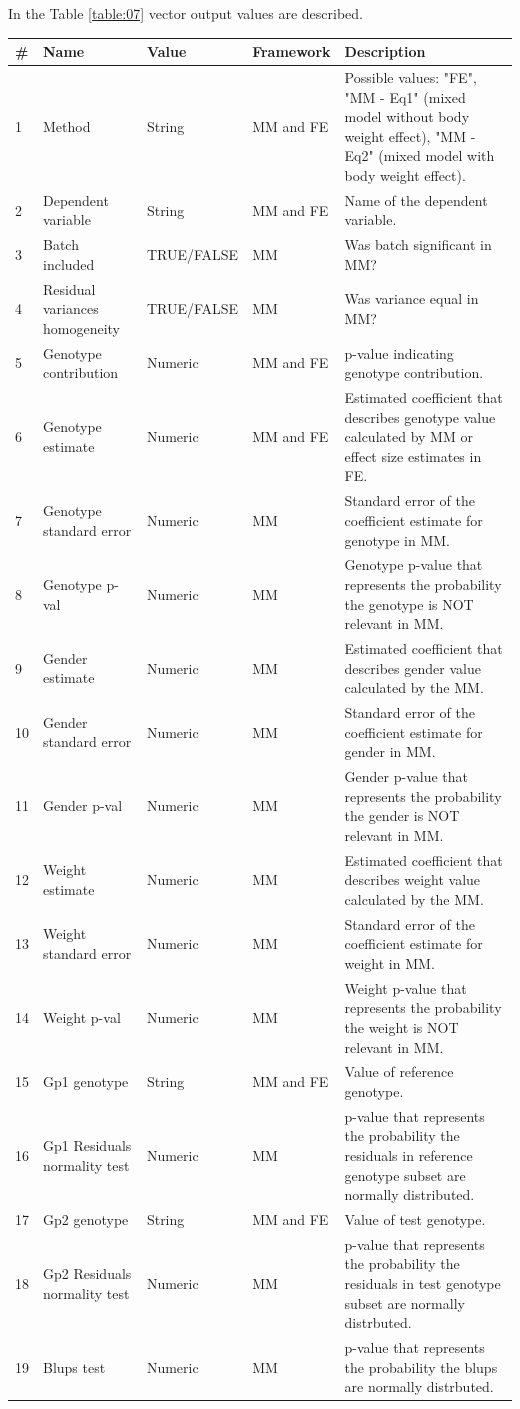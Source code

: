 \documentclass[12pt,a4paper]{article}
\begin{document}
In the Table \ref{table:07} vector output values are described.
\begin{table}
 
\begin{tabular}{| l | l | l | l | p{10cm} |}
  \hline
\#&Name&Value&Framework&Description\\\hline
1&Method&String&MM and FE&Possible values: "FE", "MM - Eq1" (mixed model without body weight effect), "MM - Eq2" (mixed model with body weight effect).\\
2&Dependent variable&String&MM and FE&Name of the dependent variable.\\
3&Batch included&TRUE/FALSE&MM&Was batch significant in MM?\\
4&Residual variances homogeneity&TRUE/FALSE&MM&Was variance equal in MM?\\
5&Genotype contribution&Numeric&MM and FE&p-value indicating genotype contribution.\\
6&Genotype estimate&Numeric&MM and FE&Estimated coefficient that describes genotype value calculated by MM or effect size estimates in FE.\\
7&Genotype standard error&Numeric&MM&Standard error of the coefficient estimate for genotype in MM.\\
8&Genotype p-val&Numeric&MM&Genotype p-value that represents the probability the genotype is NOT relevant in MM.\\
9&Gender estimate&Numeric&MM&Estimated coefficient that describes gender value calculated by the MM.\\
10&Gender standard error&Numeric&MM&Standard error of the coefficient estimate for gender in MM.\\
11&Gender p-val&Numeric&MM&Gender p-value that represents the probability the gender is NOT relevant in MM.\\
12&Weight estimate&Numeric&MM&Estimated coefficient that describes weight value calculated by the MM.\\
13&Weight standard error&Numeric&MM&Standard error of the coefficient estimate for weight in MM.\\
14&Weight p-val&Numeric&MM&Weight p-value that represents the probability the weight is NOT relevant in MM.\\
15&Gp1 genotype&String&MM and FE&Value of reference genotype.\\
16&Gp1 Residuals normality test&Numeric&MM&p-value that represents the probability the residuals in reference genotype subset are normally distributed.\\
17&Gp2 genotype&String&MM and FE&Value of test genotype.\\
18&Gp2 Residuals normality test&Numeric&MM&p-value that represents the probability the residuals in test genotype subset are normally distrbuted.\\
19&Blups test&Numeric&MM&p-value that represents the probability the blups are normally distrbuted.\\
\hline  
\end{tabular}
\end{table}
\end{document}
